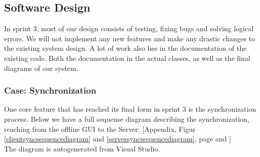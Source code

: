 \subsection{Software Design}
In sprint 3, most of our design consists of testing, fixing bugs and solving logical errors. We will not implement any new features and make any drastic changes to the existing system design. A lot of work also lies in the documentation of the existing code. Both the documentation in the actual classes, as well as the final diagrams of our system. 
\subsubsection{Case: Synchronization}
One core feature that has reached its final form in sprint 3 is the synchronization process. Below we have a full sequense diagram describing the synchronization, reaching from the offline GUI to the Server:
[Appendix, Figur \ref{clientsyncsequencediagram} and \ref{serversyncsequencediagram}, page \pageref{clientsyncsequencediagram} and \pageref{serversyncsequencediagram}]\\
The diagram is autogenerated from Visual Studio. 